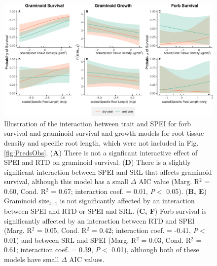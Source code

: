 \documentclass[12pt, letterpaper]{article}
\begin{document}
\begin{figure}
\includegraphics[width=.8\textwidth]{suppObservationsFig-1.pdf}
\caption{\small{
Illustration of the interaction between trait and SPEI for forb survival and graminoid survival and growth models for root tissue density and specific root length, which were not included in Fig. \ref{fig:PredsObs}.  (\textbf{A}) There is not a signficant interactive effect of SPEI and RTD on graminoid survival. (\textbf{D}) There is a slightly significant interaction between SPEI and SRL that affects graminoid survival, although this model has a small $\Delta$ AIC value (Marg. R$^2$ = 0.60, Cond. R$^2$ = 0.67; interaction coef. = 0.01, \textit{P}$<$ 0.05). (\textbf{B, E}) Graminoid size$_\textit{t+1}$ is not significantly affected by an interaction between SPEI and RTD or SPEI and SRL. (\textbf{C, F}) Forb survival is significantly affected by an interaction between RTD and SPEI (Marg. R$^2$ = 0.05, Cond. R$^2$ = 0.42; interaction coef. = -0.41, \textit{P}$<$ 0.01) and between SRL and SPEI (Marg. R$^2$ = 0.03, Cond. R$^2$ = 0.61; interaction coef. = 0.39, \textit{P}$<$ 0.01), although both of these models have small $\Delta$ AIC values.
}}
\label{fig:GramSurv_all}
\end{figure}
\end{document}
